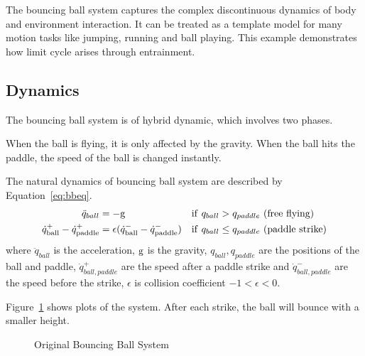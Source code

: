The bouncing ball system captures the complex discontinuous dynamics of body and environment interaction. 
It can be treated as a template model for many motion tasks like jumping, running and ball playing.
This example demonstrates how limit cycle arises through entrainment.
 
\subsection*{Dynamics}
The bouncing ball system is of hybrid dynamic, which involves two phases.
\begin{itemize}
When the ball is flying, it is only affected by the gravity.
When the ball hits the paddle, the speed of the ball is changed instantly.
\end{itemize}
The natural dynamics of bouncing ball system are described by  Equation~\ref{eq:bbeq}.
\begin{align}
\ddot{q}_{ball}&=-\mathrm{g} &\mathrm{if}\,\,q_{ball} &> q_{paddle}\,\,\mathrm{(free\,\,flying)} \nonumber\\
\dot{q}^{+}_{\mathrm{ball}} - \dot{q}^{+}_{\mathrm{paddle}} &=  \epsilon(\dot{q}^{-}_{\mathrm{ball}} - \dot{q}^{-}_{\mathrm{paddle}})&\mathrm{if}\,\,q_{ball} &\leq {q_{paddle}}\,\,\mathrm{(paddle\,\,strike)}
\label{eq:bbeq}
\end{align}
where $\ddot{q}_{ball}$ is the acceleration,
$\mathrm{g}$ is the gravity,
$q_{ball},q_{paddle}$ are the positions of the ball and paddle,
$\dot{q}^{+}_{ball,paddle}$ are the speed after a paddle strike and $\dot{q}^{-}_{ball,paddle}$ are the speed before the strike,
$\epsilon$ is collision coefficient $-1 < \epsilon <0$.

Figure~\ref{fig:bborg} shows  plots of the system. 
After each strike, the ball will bounce with a smaller height. 




\begin{figure}[h]
\begin{center}
	
\end{center}
\caption{Original Bouncing Ball System}
\label{fig:bborg}
\end{figure}



